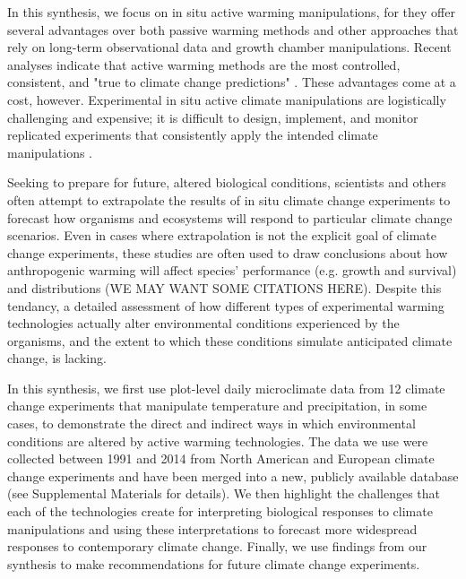 \documentclass{article}
\begin{document}
\par In this synthesis, we focus on in situ active warming  manipulations, for they offer several advantages over both passive warming methods and other approaches that rely on long-term observational data and growth chamber manipulations.  Recent analyses indicate that active warming methods are the most controlled, consistent, and "true to climate change predictions" \citep{kimball2005,kimball2008,aronson2009,wolkovich2012}. These advantages come at a cost, however.  Experimental in situ active climate  manipulations are logistically challenging  and expensive; it is difficult to design,  implement,  and  monitor  replicated experiments that consistently apply  the intended climate  manipulations \citep{aronson2009}.
\par Seeking to prepare  for future, altered  biological conditions, scientists and others  often attempt to extrapolate the results of in situ climate change experiments to forecast how organisms and ecosystems will respond to particular climate change scenarios.  Even in cases where extrapolation is not the explicit goal of climate change experiments, these studies are often used to draw conclusions  about how anthropogenic warming  will affect species' performance  (e.g. growth and  survival)  and  distributions (WE MAY WANT SOME CITATIONS HERE).  Despite this tendancy, a detailed  assessment of how different types of experimental warming technologies actually alter environmental conditions experienced by the organisms, and  the extent to which these conditions simulate anticipated climate change, is lacking.  
\par In this synthesis, we first use  plot-level daily  microclimate  data  from  12 climate  change  experiments  that  manipulate temperature and precipitation, in some cases, to demonstrate the direct and indirect ways in which environmental conditions are altered  by active  warming technologies.   The data we use were collected between 1991 and 2014 from North American and European climate change experiments and  have been merged into a new, publicly  available  database (see Supplemental Materials  for details).   We then highlight the challenges that each of the technologies create for interpreting biological responses to climate manipulations and using these interpretations to forecast  more widespread responses to contemporary climate change. Finally,  we use findings from our synthesis to make recommendations for future  climate  change experiments.

\end{document}
